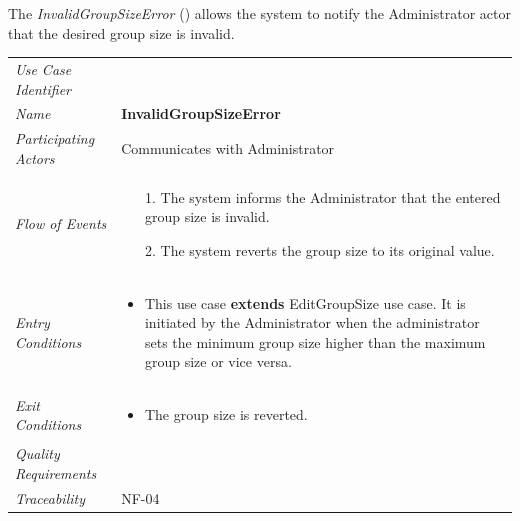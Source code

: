 \documentclass[12pt,letterpaper]{article}
\begin{document}
\newpage{}

The {\it InvalidGroupSizeError} () allows the system to notify the Administrator actor that the desired group size is invalid.

\begin{center}
	\begin{tabu} to 
		\toprule
		Use Case Identifier &  \\
		Name & {\bf InvalidGroupSizeError} \\
		Participating Actors & Communicates with Administrator \\
		Flow of Events & 
		\begin{minipage}[t]{\linewidth}
		    \begin{enumerate}
			    \item[1.] The system informs the Administrator that the entered group size is invalid.
			    \item[2.] The system reverts the group size to its original value.
			\end{enumerate}
        \end{minipage} \\

		Entry Conditions &
		\begin{minipage}[t]{\linewidth}
			\begin{itemize}
			    \item This use case \textbf{extends} EditGroupSize use case. It is initiated by the Administrator when the administrator sets the minimum group size higher than the maximum group size or vice versa.
	        \end{itemize}
        \end{minipage} \\

		Exit Conditions &
		\begin{minipage}[t]{\linewidth}
			\begin{itemize}
			    \item The group size is reverted.
	        \end{itemize}
        \end{minipage} \\

		Quality Requirements & \\

		Traceability & NF-04 \\
		\toprule
	\end{tabu}
\end{center}
\end{document}
